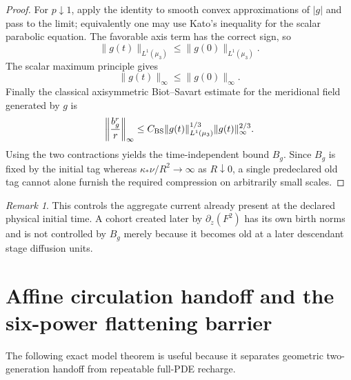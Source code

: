 \documentclass[11pt]{article}
\theoremstyle{definition}\newtheorem{definition}[theorem]{Definition}
\theoremstyle{remark}\newtheorem{remark}[theorem]{Remark}
\begin{document}
\begin{proof}
For $p\downarrow1$, apply the identity to smooth convex approximations of $|g|$ and pass to the limit; equivalently one may use Kato's inequality for the scalar parabolic equation.  The favorable axis term has the correct sign, so
\[
 \|g(t)\|_{L^1(\mu_3)}\le\|g(0)\|_{L^1(\mu_3)}.
\]
The scalar maximum principle gives
\[
 \|g(t)\|_\infty\le\|g(0)\|_\infty.
\]
Finally the classical axisymmetric Biot--Savart estimate for the meridional field generated by $g$ is
\[
 \left\|\frac{b_g^r}{r}\right\|_\infty
 \le C_{\rm BS}
 \|g(t)\|_{L^1(\mu_3)}^{1/3}
 \|g(t)\|_\infty^{2/3}.
\]
Using the two contractions yields the time-independent bound $B_g$.  Since $B_g$ is fixed by the initial tag whereas $\kappa_*\nu/R^2\to\infty$ as $R\downarrow0$, a single predeclared old tag cannot alone furnish the required compression on arbitrarily small scales.
\end{proof}
\begin{remark}
This controls the aggregate current already present at the declared physical
initial time.  A cohort created later by $\partial_z(F^2)$ has its own birth
norms and is not controlled by $B_g$ merely because it becomes old at a later descendant stage
diffusion units.
\end{remark}


\section{Affine circulation handoff and the six-power flattening barrier}
\label{sec:affineflattening}

The following exact model theorem is useful because it separates geometric
two-generation handoff from repeatable full-PDE recharge.
\end{document}
